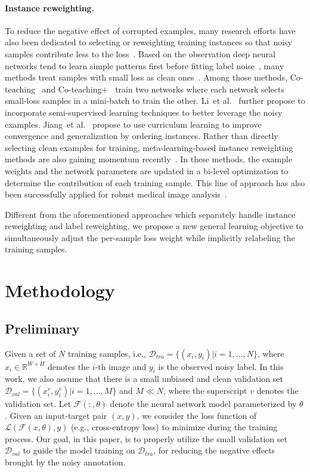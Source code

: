 \documentclass{article}
\begin{document}
\paragraph{Instance reweighting.}
To reduce the negative effect of corrupted examples, many research efforts have also been dedicated to selecting or reweighting training instances so that noisy samples contribute less to the loss~\cite{jiang2018mentornet,ren2018learning,fang2020rethinking}.
Based on the observation deep neural networks tend to learn simple patterns first before fitting label noise~\cite{arpit2017closer},
many methods treat samples with small loss as clean ones~\cite{jiang2018mentornet,shen2019learning,han2018co,yu2019does,Wei_2020_CVPR}.
Among those methods,
Co-teaching~\cite{han2018co} and Co-teaching$+$~\cite{yu2019does} train two networks where each network selects small-loss samples in a mini-batch to train the other.
Li~et al.~\cite{li2020dividemix} further propose to incorporate semi-supervised learning techniques to better leverage the noisy examples.
Jiang~et al.~\cite{jiang2018mentornet} propose to use curriculum learning to improve convergence and generalization by ordering instances.
Rather than directly selecting clean examples for training, meta-learning-based instance reweighting methods are also gaining momentum recently~\cite{ren2018learning,shu2019meta,xu2021faster}.
In these methods, the example weights and the network parameters are updated in a bi-level optimization to determine
the contribution of each training sample.
This line of approach has also been successfully applied for robust medical image analysis~\cite{xue2019robust,mirikharaji2019learning}.


Different from the aforementioned approaches which separately handle instance reweighting and label reweighting, we propose a new general learning objective to simultaneously adjust the per-sample loss weight while implicitly relabeling the training samples.


\section{Methodology}
\label{sec:method}
\subsection{Preliminary}
Given a set of $N$ training samples, i.e., $\mathcal{D}_{tra} = \{(x_i, y_i)| i = 1,...,N\}$, where $x_i \in \mathbb{R}^{W\times H}$ denotes the $i$-th image and $y_i$ is the observed noisy label. 
In this work, we also assume that there is a small unbiased and clean validation set $\mathcal{D}_{val} = \{(x^v_i, y^v_i)|i= 1,...,M\}$ and $M \ll N$, where the superscript $v$ denotes the validation set. 
Let $\mathcal{F} (:, \theta)$ denote the neural network model parameterized by $\theta$. 
Given an input-target pair $(x, y)$, we consider the loss function of
$\mathcal{L}(\mathcal{F} (x,\theta), y)$ (e.g., cross-entropy loss) to minimize during the training process.
Our goal, in this paper, is to properly utilize the small validation set $\mathcal{D}_{val}$ to guide the model training on $\mathcal{D}_{tra}$, for reducing the negative effects brought by the noisy annotation.
\end{document}
